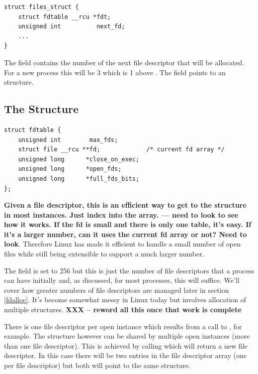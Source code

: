 \begin{lstlisting}
struct files_struct {
    struct fdtable __rcu *fdt;
    unsigned int          next_fd;
    ...
}
\end{lstlisting}

\noindent
The  field contains the number of the next file descriptor that will be allocated. For a new process this will be 3 which is 1 above . The  field points to an  structure.


\subsection{The  Structure}

\begin{lstlisting}
struct fdtable {
    unsigned int        max_fds;
    struct file __rcu **fd;             /* current fd array */
    unsigned long      *close_on_exec;
    unsigned long      *open_fds;
    unsigned long      *full_fds_bits;
};  
\end{lstlisting}

\noindent
\textbf{Given a file descriptor, this is an efficient way to get to the  structure in most instances. Just index into the  array. --- need to look to see how it works. If the fd is small and there is only one table, it's easy. If it's a larger number, can it uses the current fd array or not? Need to look}. Therefore Linux has made it efficient to handle a small number of open files while still being extensible to support a much larger number.

The  field is set to 256 but this is just the number of file descriptors that a process can have initially and, as discussed, for most processes, this will suffice. We'll cover how greater numbers of file descriptors are managed later in section \ref{fdalloc}. It's become somewhat messy in Linux today but involves allocation of multiple  structures. \textbf{XXX -- reword all this once that work is complete}

There is one file descriptor per open instance which results from a call to ,  for example. The  structure however can be shared by multiple open instances (more than one file descriptor). This is achieved by calling  which will return a new file descriptor. In this case there will be two entries in the file descriptor array (one per file descriptor) but both will point to the same  structure.

